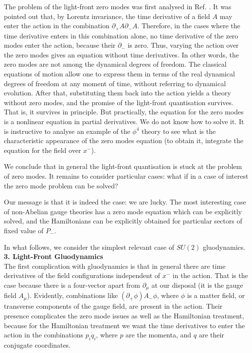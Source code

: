 \documentclass[a4paper,12pt]{article}
\begin{document}
The problem of the light-front zero modes was first analysed in 
Ref. \cite{Maskawa}.
It was pointed out that, by Lorentz invariance, 
the time derivative of a field $A$ 
may enter the action in the combination $\partial_+ A\partial_- A$. 
Therefore, in the cases where the time derivative enters in this combination alone,
no time derivative of the zero modes enter the action, 
because their $\partial_-$ is zero.
Thus, varying the action over the zero modes gives an equation without time 
derivatives. In other words, the zero modes are not among the dynamical 
degrees of freedom.
The classical equations of motion allow 
one to express
them in terms of the real dynamical
degrees of freedom at any moment of time, without referring 
to dynamical evolution. 
After that, substituting them back into the action yields 
a theory without zero 
modes, and the promise of the light-front quantisation survives. 
That is, it survives in principle. But practically, the equation 
for the zero modes is a nonlinear equation in partial derivatives. 
We do not know how to solve it. It is instructive to 
analyse an example of the $\phi^4$ theory to see what is the characteristic 
appearance of the zero modes equation (to obtain it, integrate the equation 
for the field over $x^-$).

We conclude that in general the light-front quantisation is stuck at 
the problem of zero modes. It remains to consider particular cases: 
what if in a case of interest the 
zero mode problem can be solved?

Our message is that it is indeed the case: we are lucky. 
The most interesting case 
of non-Abelian gauge theories has a zero mode equation 
which can be explicitly solved, and the Hamiltonians can be 
explicitly obtained for particular sectors of 
fixed value of $P_-$.

In what follows, we consider the simplest relevant case of $SU(2)$ 
gluodynamics.\\

{\bf 3. Light-Front Gluodynamics }\\

The first complication with gluodynamics is that in general there are time 
derivatives of the field configurations independent of $x^-$ in the action. 
That is the case because there is a four-vector apart from 
$\partial_\mu$ at our disposal 
(it is the gauge field $A_\mu$).
Evidently, combinations like $(\partial_+\phi)A_-\phi$, where 
$\phi$ is a matter 
field, or transverse components of the gauge field, are present in the action.
Their presence complicates
the zero mode issues as well as the Hamiltonian treatment, 
because for the Hamiltonian treatment 
we want the time derivatives to enter the action in the combinations 
$p_i\dot{q}_i$, where $p$ are the momenta, and $q$ are their conjugate 
coordinates.
\end{document}
